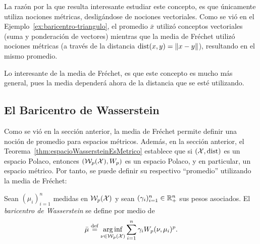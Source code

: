 {{{			\begin{remark}
				La razón por la que resulta interesante estudiar este concepto, es que únicamente utiliza nociones métricas, desligándose de nociones vectoriales. Como se vió en el Ejemplo~\ref{ex:baricentro-triangulo}, el promedio $\bar x$ utilizó conceptos vectoriales (suma y ponderación de vectores) mientras que la media de Fréchet utilizó nociones métricas (a través de la distancia $\dist(x, y) = \|x - y\|$), resultando en el mismo promedio.

				Lo interesante de la media de Fréchet, es que este concepto es mucho más general, pues la media dependerá ahora de la distancia que se esté utilizando.

			\end{remark}

		}  %

		\subsection{El Baricentro de Wasserstein}\label{ssec:el-baricentro-de-Wasserstein}
		{
			Como se vió en la sección anterior, la media de Fréchet permite definir una noción de promedio para espacios métricos. Además, en la sección anterior, el Teorema~\ref{thm:espacioWassersteinEsMetrico} establece que si $(\cX, \dist)$ es un espacio Polaco, entonces $(\WassersteinSpace[p]{\cX}, W_p)$ es un espacio Polaco, y en particular, un espacio métrico. Por tanto, se puede definir su respectivo ``promedio'' utilizando la media de Fréchet:

			\begin{definition}
				Sean $(\mu_{i})_{i=1}^{n}$ medidas en $\WassersteinSpace[p]{\cX} $ y sean $(\gamma_{i})_{i=1}^{n} \in \R_+^n$ sus pesos asociados. El \emph{baricentro de Wasserstein} se define por medio de
				\begin{equation}
					\bar \mu \eqdef \arginf_{\nu \in \WassersteinSpace[p]{\cX} } \sum_{i=1}^{n} \gamma_i \Wasserstein[p]{\nu}{\mu_i}^p.
				\end{equation}

			\end{definition}

}}}
